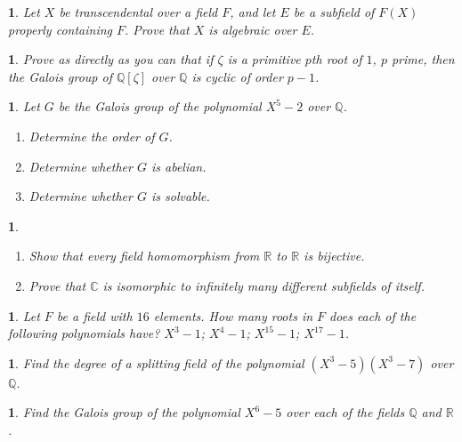 \documentclass[a4paper,11pt,final,openany]{memoir}
\newtheorem{exercise}[Y]{}
\theoremstyle{nonumberplain}
\begin{document}
\begin{exercise}
\label{x28} Let $X$ be transcendental over a field $F$, and let $E$ be a
subfield of $F(X)$ properly containing $F$. Prove that $X$ is algebraic over
$E$.
\end{exercise}

\begin{exercise}
\label{x29} Prove as directly as you can that if $\zeta$ is a primitive $p$th
root of $1$, $p$ prime, then the Galois group of ${\mathbb{Q}}[\zeta]$ over
${\mathbb{Q}}$ is cyclic of order $p-1$.
\end{exercise}

\begin{exercise}
\label{x30} Let $G$ be the Galois group of the polynomial $X^{5}-2$ over
${\mathbb{Q}}$.

\begin{enumerate}
\item Determine the order of $G$.

\item Determine whether $G$ is abelian.

\item Determine whether $G$ is solvable.
\end{enumerate}
\end{exercise}

\begin{exercise}
\label{x31}

\begin{enumerate}
\item Show that every field homomorphism from $\mathbb{R}$ to $\mathbb{R}$ is bijective.

\item Prove that $\mathbb{C}$ is isomorphic to infinitely many different
subfields of itself.
\end{enumerate}
\end{exercise}

\begin{exercise}
\label{x32} Let $F$ be a field with $16$ elements. How many roots in $F$ does
each of the following polynomials have? $X^{3}-1$; $X^{4}-1$; $X^{15}-1$;
$X^{17}-1$.
\end{exercise}

\begin{exercise}
\label{x33} Find the degree of a splitting field of the polynomial
$(X^{3}-5)(X^{3}-7)$ over ${\mathbb{Q}}$.
\end{exercise}

\begin{exercise}
\label{x34} Find the Galois group of the polynomial $X^{6}-5$ over each of the
fields ${\mathbb{Q}}$ and $\mathbb{R}$.
\end{exercise}
\end{document}
